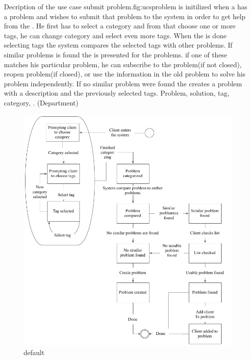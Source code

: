 \begin{sadlist}[h]{\ucsproblem[c]}{Decription of the use case submit problem.}{fig:ucsproblem}
\ucsproblem[c] is initilized when a \aclient{} has a problem and wishes to submit that problem to the system in order to get help from the \astaff{}. 
He first has to select a category and from that choose one or more tags, he can change category and select even more tags. 
When the \aclient{} is done selecting tags the system compares the selected tags with other problems. 
If similar problems is found the \aclient{} is presented for the problems.
if one of these matches his particular problem, he can subscribe to the problem(if not closed), reopen problem(if closed), or use the information in the old problem to solve his problem independently. 
If no similar problem were found the \aclient{} creates a problem with a description and the previously selected tags. 
 Problem, solution, tag, category, \client. (Department)



\end{sadlist}

\begin{figure}[htbp]
\begin{center}
 \includegraphics[scale=1]{input/application_domain_analysis/submit_problem_use_case}
\caption{default}
\label{default}
\end{center}
\end{figure}
